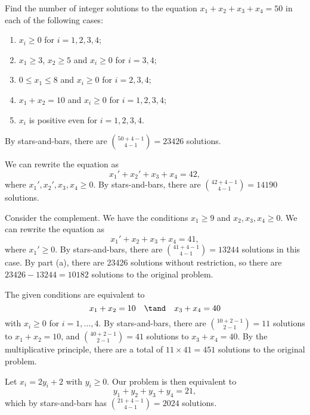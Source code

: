\begin{problem}
    Find the number of integer solutions to the equation $x_1 + x_2 + x_3 + x_4 = 50$ in each of the following cases:
    \begin{enumerate}
        \item $x_i \geq 0$ for $i = 1, 2, 3, 4$;
        \item $x_1 \geq 3$, $x_2 \geq 5$ and $x_i \geq 0$ for $i = 3, 4$;
        \item $0 \leq x_1 \leq 8$ and $x_i \geq 0$ for $i = 2, 3, 4$;
        \item $x_1 + x_2 = 10$ and $x_i \geq 0$ for $i = 1, 2, 3, 4$;
        \item $x_i$ is positive even for $i = 1, 2, 3, 4$.
    \end{enumerate}
\end{problem}
\begin{solution}
    \begin{ppart}
        By stars-and-bars, there are $\binom{50+4-1}{4-1} = 23426$ solutions.
    \end{ppart}
    \begin{ppart}
        We can rewrite the equation as \[x_1' + x_2' + x_3 + x_4 = 42,\] where $x_1', x_2', x_3, x_4 \geq 0$. By stars-and-bars, there are $\binom{42+4-1}{4-1} = 14190$ solutions.
    \end{ppart}
    \begin{ppart}
        Consider the complement. We have the conditions $x_1 \geq 9$ and $x_2, x_3, x_4 \geq 0$. We can rewrite the equation as \[x_1' + x_2 + x_3 + x_4 = 41,\] where $x_1' \geq 0$. By stars-and-bars, there are $\binom{41+4-1}{4-1} = 13244$ solutions in this case. By part (a), there are 23426 solutions without restriction, so there are $23426 - 13244 = 10182$ solutions to the original problem.
    \end{ppart}
    \begin{ppart}
        The given conditions are equivalent to \[x_1 + x_2 = 10 \quad \tand \quad x_3 + x_4 = 40\] with $x_i \geq 0$ for $i = 1, \dots, 4$. By stars-and-bars, there are $\binom{10+2-1}{2-1} = 11$ solutions to $x_1 + x_2 = 10$, and $\binom{40+2-1}{2-1} = 41$ solutions to $x_3 + x_4 = 40$. By the multiplicative principle, there are a total of $11 \times 41 = 451$ solutions to the original problem.
    \end{ppart}
    \begin{ppart}
        Let $x_i = 2y_i + 2$ with $y_i \geq 0$. Our problem is then equivalent to \[y_1 + y_2 + y_3 + y_4 = 21,\] which by stars-and-bars has $\binom{21+4-1}{4-1} = 2024$ solutions.
    \end{ppart}
\end{solution}

